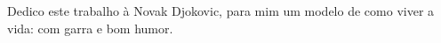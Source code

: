 Dedico este trabalho à Novak Djokovic, para mim um modelo de como viver a
vida: com garra e bom humor. 
